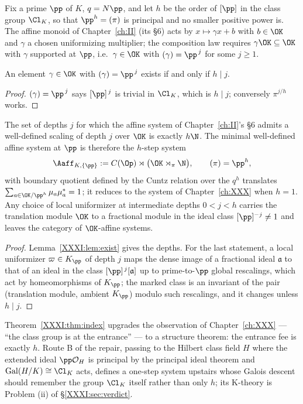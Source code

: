 Fix a prime $\pp$ of $K$, $q=\Ns\pp$, and let $h$ be the order of $[\pp]$ in the class
group $\Cl_K$, so that $\pp^h=(\pi)$ is principal and no smaller positive power is. The
affine monoid of Chapter~\ref{ch:II} (its \S6) acts by $x\mapsto\gamma x+b$ with $b\in\OK$ and
$\gamma$ a chosen uniformizing multiplier; the composition law requires $\gamma\OK\subseteq
\OK$ with $\gamma$ supported at $\pp$, i.e.\ $\gamma\in\OK$ with $(\gamma)=\pp^{\,j}$ for
some $j\ge1$.

\begin{lemma}\label{XXXI:lem:exist}
An element $\gamma\in\OK$ with $(\gamma)=\pp^{\,j}$ exists if and only if $h\mid j$.
\end{lemma}

\begin{proof}
$(\gamma)=\pp^{\,j}$ says $[\pp]^{\,j}$ is trivial in $\Cl_K$, which is $h\mid j$;
conversely $\pi^{j/h}$ works.
\end{proof}

\begin{theorem}\label{XXXI:thm:index}
The set of depths $j$ for which the affine system of Chapter~\ref{ch:II}'s \S6 admits a well-defined
scaling of depth $j$ over $\OK$ is exactly $h\N$. The minimal well-defined affine system
at $\pp$ is therefore the $h$-step system
\[
\Aaff_{K,\{\pp\}}:=C(\Op)\rtimes\bigl(\OK\rtimes_\pi\N\bigr),\qquad(\pi)=\pp^{h},
\]
with boundary quotient defined by the Cuntz relation over the $q^h$ translates
$\sum_{a\in\OK/\pp^{h}}\mu_a\mu_a^*=1$; it reduces to the system of Chapter~\ref{ch:XXX} when $h=1$.
Any choice of local uniformizer at intermediate depths $0<j<h$ carries the translation
module $\OK$ to a fractional module in the ideal class $[\pp]^{-j}\ne1$ and leaves the
category of $\OK$-affine systems.
\end{theorem}

\begin{proof}
Lemma~\ref{XXXI:lem:exist} gives the depths. For the last statement, a local uniformizer
$\varpi\in K_\pp$ of depth $j$ maps the dense image of a fractional ideal $\mathfrak a$ to
that of an ideal in the class $[\pp]^{\,j}[\mathfrak a]$ up to prime-to-$\pp$ global
rescalings, which act by homeomorphisms of $K_\pp$; the marked class is an invariant of
the pair (translation module, ambient $K_\pp$) modulo such rescalings, and it changes
unless $h\mid j$.
\end{proof}

\begin{remark}
Theorem~\ref{XXXI:thm:index} upgrades the observation of Chapter~\ref{ch:XXX} --- ``the class group is at
the entrance'' --- to a structure theorem: the entrance fee is exactly $h$. Route B of the
repair, passing to the Hilbert class field $H$ where the extended ideal $\pp\mathcal O_H$
is principal by the principal ideal theorem \cite[VI.7]{Neukirch} and
$\mathrm{Gal}(H/K)\cong\Cl_K$ acts, defines a one-step system upstairs whose Galois
descent should remember the group $\Cl_K$ itself rather than only $h$; its K-theory is
Problem (ii) of \S\ref{XXXI:sec:verdict}.
\end{remark}

